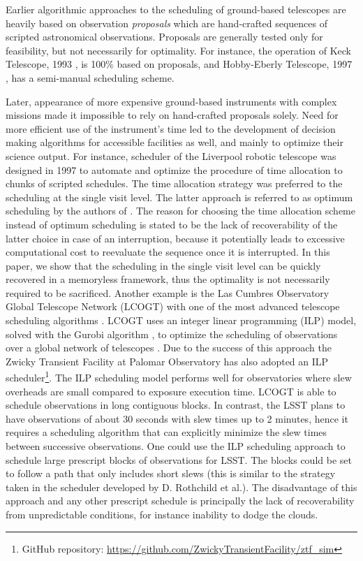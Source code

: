 \documentclass[12pt]{aastex62}
\theoremstyle{definition}
\begin{document}
Earlier algorithmic approaches to the scheduling of ground-based telescopes are heavily based on observation \textit{proposals} which are hand-crafted sequences of scripted astronomical observations. Proposals are generally tested only for feasibility, but not necessarily for optimality. For instance, the operation of Keck Telescope, 1993 \citep{nelson1985design}, is 100\% based on proposals, and Hobby-Eberly Telescope, 1997 \citep{shetrone2007ten}, has a semi-manual scheduling scheme.

Later, appearance of more expensive ground-based instruments with complex missions made it impossible to rely on hand-crafted proposals solely. Need for more efficient use of the instrument's time led to the development of decision making algorithms for accessible facilities as well, and mainly to optimize their science output. For instance, scheduler of the Liverpool robotic telescope was designed in 1997 to automate and optimize the procedure of time allocation to chunks of scripted schedules. The time allocation strategy was preferred to the scheduling at the single visit level. The latter approach is referred to as optimum scheduling by the authors of \citep{steele1997control}. The reason for choosing the time allocation scheme instead of optimum scheduling is stated to be the lack of recoverability of the latter choice in case of an interruption, because it potentially leads to excessive computational cost to reevaluate the sequence once it is interrupted. In this paper, we show that the scheduling in the single visit level can be quickly recovered in a memoryless framework, thus the optimality is not necessarily required to be sacrificed. Another example is the Las Cumbres Observatory Global Telescope Network (LCOGT) with one of the most advanced telescope scheduling algorithms \citep{Boroson14, Saunders14}. LCOGT uses an integer linear programming (ILP) model, solved with the Gurobi algorithm \citep{gurobi}, to optimize the scheduling of observations over a global network of telescopes \citep{Lampoudi15}. Due to the success of this approach the Zwicky Transient Facility at Palomar Observatory \citep{Bellm14} has also adopted an ILP scheduler\footnote{GitHub repository: \url{https://github.com/ZwickyTransientFacility/ztf_sim}}. The ILP scheduling model performs well for observatories where slew overheads are small compared to exposure execution time. LCOGT is able to schedule observations in long contiguous blocks. In contrast, the LSST plans to have observations of about 30 seconds with slew times up to 2 minutes, hence it requires a scheduling algorithm that can explicitly minimize the slew times between successive observations. One could use the ILP scheduling approach to schedule large prescript blocks of observations for LSST. The blocks could be set to follow a path that only includes short slews (this is similar to the strategy taken in the scheduler developed by D. Rothchild et al.). The disadvantage of this approach and any other prescript schedule is principally the lack of recoverability from unpredictable conditions, for instance inability to dodge the clouds.
\end{document}
